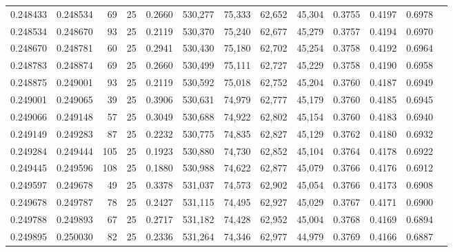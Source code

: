 \begin{tabular}{rrrrrrrrrrrrr}
0.248433 & 0.248534 &    69 &  25 &                                     0.2660 & 530,277 &  75,333 &  62,652 &  45,304 & 0.3755 & 0.4197 & 0.6978 \\
0.248534 & 0.248670 &    93 &  25 &                                     0.2119 & 530,370 &  75,240 &  62,677 &  45,279 & 0.3757 & 0.4194 & 0.6970 \\
0.248670 & 0.248781 &    60 &  25 &                                     0.2941 & 530,430 &  75,180 &  62,702 &  45,254 & 0.3758 & 0.4192 & 0.6964 \\
0.248783 & 0.248874 &    69 &  25 &                                     0.2660 & 530,499 &  75,111 &  62,727 &  45,229 & 0.3758 & 0.4190 & 0.6958 \\
0.248875 & 0.249001 &    93 &  25 &                                     0.2119 & 530,592 &  75,018 &  62,752 &  45,204 & 0.3760 & 0.4187 & 0.6949 \\
0.249001 & 0.249065 &    39 &  25 &                                     0.3906 & 530,631 &  74,979 &  62,777 &  45,179 & 0.3760 & 0.4185 & 0.6945 \\
0.249066 & 0.249148 &    57 &  25 &                                     0.3049 & 530,688 &  74,922 &  62,802 &  45,154 & 0.3760 & 0.4183 & 0.6940 \\
0.249149 & 0.249283 &    87 &  25 &                                     0.2232 & 530,775 &  74,835 &  62,827 &  45,129 & 0.3762 & 0.4180 & 0.6932 \\
0.249284 & 0.249444 &   105 &  25 &                                     0.1923 & 530,880 &  74,730 &  62,852 &  45,104 & 0.3764 & 0.4178 & 0.6922 \\
0.249445 & 0.249596 &   108 &  25 &                                     0.1880 & 530,988 &  74,622 &  62,877 &  45,079 & 0.3766 & 0.4176 & 0.6912 \\
0.249597 & 0.249678 &    49 &  25 &                                     0.3378 & 531,037 &  74,573 &  62,902 &  45,054 & 0.3766 & 0.4173 & 0.6908 \\
0.249678 & 0.249787 &    78 &  25 &                                     0.2427 & 531,115 &  74,495 &  62,927 &  45,029 & 0.3767 & 0.4171 & 0.6900 \\
0.249788 & 0.249893 &    67 &  25 &                                     0.2717 & 531,182 &  74,428 &  62,952 &  45,004 & 0.3768 & 0.4169 & 0.6894 \\
0.249895 & 0.250030 &    82 &  25 &                                     0.2336 & 531,264 &  74,346 &  62,977 &  44,979 & 0.3769 & 0.4166 & 0.6887 \\

\end{tabular}
